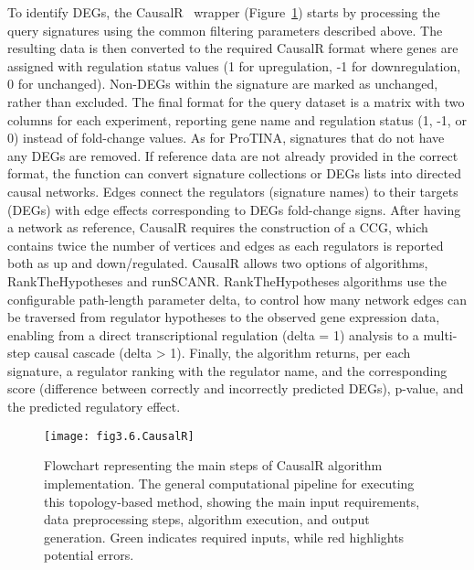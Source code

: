 To identify \gls{DEGs}, the CausalR~\cite{RN32} wrapper (Figure~\ref{fig:fig3.6.CausalR}) starts by processing the query signatures using the common filtering parameters described above.
The resulting data is then converted to the required CausalR format where genes are assigned with regulation status values (1 for upregulation, -1 for downregulation, 0 for unchanged).
Non-\gls{DEGs} within the signature are marked as unchanged, rather than excluded. The final format for the query dataset is a matrix with two columns for each experiment, reporting gene name and regulation status (1, -1, or 0) instead of fold-change values.
As for \gls{ProTINA}, signatures that do not have any \gls{DEGs} are removed. If reference data are not already provided in the correct format, the function can convert signature collections or \gls{DEGs} lists into directed causal networks.
Edges connect the regulators (signature names) to their targets (\gls{DEGs}) with edge effects corresponding to \gls{DEGs} fold-change signs. 
After having a network as reference, CausalR requires the construction of a \gls{CCG}, which contains twice the number of vertices and edges as each regulators is reported both as up and down/regulated.
CausalR allows two options of algorithms, RankTheHypotheses and runSCANR.
RankTheHypotheses algorithms use the configurable path-length parameter delta, to control how many network edges can be traversed from regulator hypotheses to the observed gene expression data, enabling from a direct transcriptional regulation (delta = 1) analysis to a multi-step causal cascade (delta > 1).
Finally, the algorithm returns, per each signature, a regulator ranking with the regulator name, and the corresponding score (difference between correctly and incorrectly predicted \gls{DEGs}), p-value, and the predicted regulatory effect.

\begin{figure}[htbp]
    \centering
    \texttt{[image: fig3.6.CausalR]}
    \caption[Flowchart representing the main steps of CausalR algorithm implementation.]{Flowchart representing the main steps of CausalR algorithm implementation. The general computational pipeline for executing this topology-based method, showing the main input requirements, data preprocessing steps, algorithm execution, and output generation. Green indicates required inputs, while red highlights potential errors.}
    \label{fig:fig3.6.CausalR}
\end{figure}

